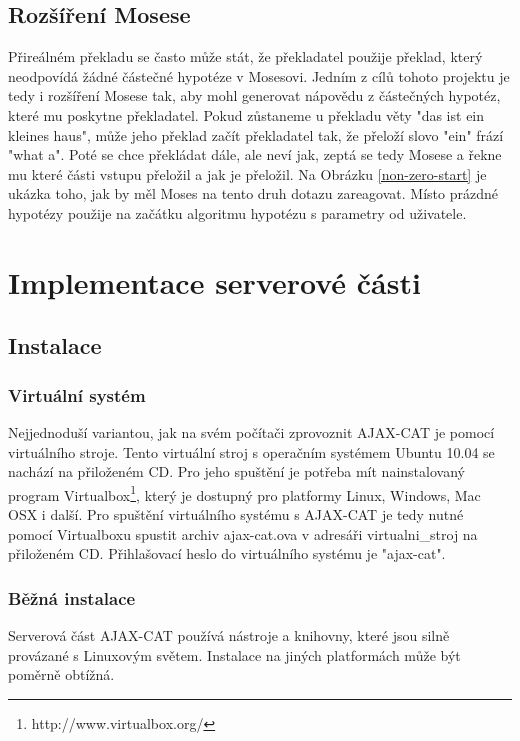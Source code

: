 \documentclass[12pt,a4paper]{report}
\begin{document}
\section{Rozšíření Mosese}

Přireálném překladu se často může stát, že překladatel použije překlad, který neodpovídá žádné částečné hypotéze v Mosesovi. Jedním z cílů tohoto projektu je tedy i rozšíření Mosese tak, aby mohl generovat nápovědu z částečných hypotéz, které mu poskytne překladatel. Pokud zůstaneme u překladu věty "das ist ein kleines haus", může jeho překlad začít překladatel tak, že přeloží slovo "ein" frází "what a". Poté se chce překládat dále, ale neví jak, zeptá se tedy Mosese a řekne mu které části vstupu přeložil a jak je přeložil. Na Obrázku \ref{non-zero-start} je ukázka toho, jak by měl Moses na tento druh dotazu zareagovat. Místo prázdné hypotézy použije na začátku algoritmu hypotézu s parametry od uživatele.




\chapter{Implementace serverové části}

\section{Instalace}

\subsection{Virtuální systém}

Nejjednoduší variantou, jak na svém počítači zprovoznit AJAX-CAT je pomocí virtuálního stroje. Tento virtuální stroj s operačním systémem Ubuntu 10.04 se nachází na přiloženém CD. Pro jeho spuštění je potřeba mít nainstalovaný program Virtualbox\footnote{http://www.virtualbox.org/}, který je dostupný pro platformy Linux, Windows, Mac OSX i další. Pro spuštění virtuálního systému s AJAX-CAT je tedy nutné pomocí Virtualboxu spustit archiv ajax-cat.ova v adresáři virtualni\_stroj na přiloženém CD. Přihlašovací heslo do virtuálního systému je "ajax-cat".

\subsection{Běžná instalace}
Serverová část AJAX-CAT používá nástroje a knihovny, které jsou silně provázané s Linuxovým světem. Instalace na jiných platformách může být poměrně obtížná.
\end{document}
